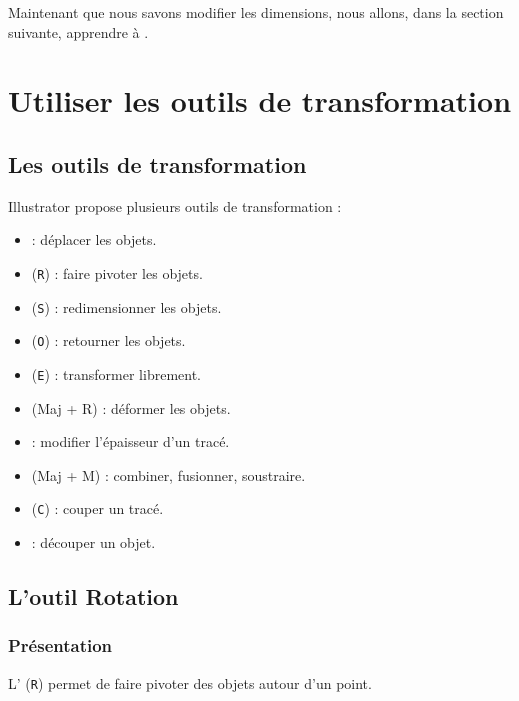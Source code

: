 Maintenant que nous savons modifier les dimensions, nous allons, dans la section suivante, apprendre à .

\section{Utiliser les outils de transformation}

\subsection{Les outils de transformation}

Illustrator propose plusieurs outils de transformation :

\begin{itemize}
    \item {} : déplacer les objets.
    \item {} (\texttt{R}) : faire pivoter les objets.
    \item {} (\texttt{S}) : redimensionner les objets.
    \item {} (\texttt{O}) : retourner les objets.
    \item {} (\texttt{E}) : transformer librement.
    \item {} (Maj + R) : déformer les objets.
    \item {} : modifier l'épaisseur d'un tracé.
    \item {} (Maj + M) : combiner, fusionner, soustraire.
    \item {} (\texttt{C}) : couper un tracé.
    \item {} : découper un objet.
\end{itemize}

\subsection{L'outil Rotation}

\subsubsection{Présentation}

L' (\texttt{R}) permet de faire pivoter des objets autour d'un point.

